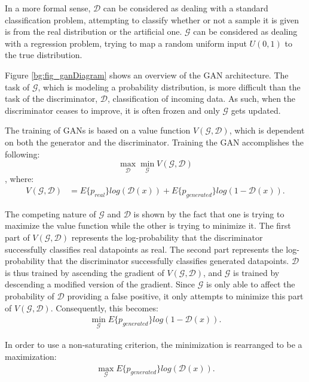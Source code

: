 	\par In a more formal sense, $\mathcal{D}$ can be considered as dealing with a standard classification problem, attempting to classify whether or not a sample it is given is from the real distribution or the artificial one. $\mathcal{G}$ can be considered as dealing with a regression problem, trying to map a random uniform input $U(0,1)$ to the true distribution. 
	\par Figure \ref{bg:fig_ganDiagram} shows an overview of the GAN architecture. The task of $\mathcal{G}$, which is modeling a probability distribution, is more difficult than the task of the discriminator, $\mathcal{D}$, classification of incoming data. As such, when the discriminator ceases to improve, it is often frozen and only $\mathcal{G}$ gets updated. 
	\par The training of GANs is based on a value function $V(\mathcal{G},\mathcal{D})$, which is dependent on both the generator and the discriminator. Training the GAN accomplishes the following: 
	\[ \max_\mathcal{D}\min_\mathcal{G} V(\mathcal{G},\mathcal{D}) \], where:
	\begin{align}
		V(\mathcal{G},\mathcal{D}) &= E\{p_{real}\}log(\mathcal{D}(x)) + E\{p_{generated}\} log(1-\mathcal{D}(x)).
	\end{align}
	\par The competing nature of $\mathcal{G}$ and $\mathcal{D}$ is shown by the fact that one is trying to maximize the value function while the other is trying to minimize it. The first part of $V(\mathcal{G},\mathcal{D})$ represents the log-probability that the discriminator successfully classifies real datapoints as real. The second part represents the log-probability that the discriminator successfully classifies generated datapoints. $\mathcal{D}$ is thus trained by ascending the gradient of $V(\mathcal{G},\mathcal{D})$, and $\mathcal{G}$ is trained by descending a modified version of the gradient. Since $\mathcal{G}$ is only able to affect the probability of $\mathcal{D}$ providing a false positive, it only attempts to minimize this part of $V(\mathcal{G},\mathcal{D})$. Consequently, this becomes:
	\begin{align}
		\min_\mathcal{G} E\{p_{generated}\} log(1-\mathcal{D}(x)).
	\end{align}
	\par In order to use a non-saturating criterion, the minimization is rearranged to be a maximization:
	\begin{align}
		\max_\mathcal{G} E\{p_{generated}\} log(\mathcal{D}(x)). \label{eq:bg_nonsatG} 
	\end{align}
